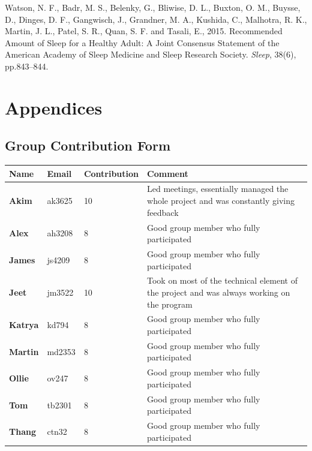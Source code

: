 \documentclass[12pt]{article}
\begin{document}
\begin{thebibliography}{99}
    Watson, N. F., Badr, M. S., Belenky, G., Bliwise, D. L., Buxton, O. M., Buysse, D., 
    Dinges, D. F., Gangwisch, J., Grandner, M. A., Kushida, C., Malhotra, R. K., Martin, J. L., Patel, S. R., 
    Quan, S. F. and Tasali, E., 2015. 
    Recommended Amount of Sleep for a Healthy Adult: 
    A Joint Consensus Statement of the American Academy of Sleep Medicine and Sleep Research Society. 
    \textit{Sleep}, 38(6), pp.843–844.
\end{thebibliography}


\newpage
\section{Appendices}
\subsection{Group Contribution Form}

\begin{table}[!ht]
\centering
\begin{tabular}{|p{1.5cm}|p{1.5cm}|p{3cm}|p{6cm}|}
\hline
\textbf{Name} & \textbf{Email} & \textbf{Contribution} & \textbf{Comment} \\
\hline
\textbf{Akim} &  ak3625 & 10 & Led meetings, essentially managed the whole project and was constantly giving feedback  \\
\hline
\textbf{Alex} & ah3208 & 8 & Good group member who fully participated \\
\hline
\textbf{James} & js4209 & 8 & Good group member who fully participated\\
\hline
\textbf{Jeet} & jm3522 & 10 & Took on most of the technical element of the project and was always working on the program\\
\hline
\textbf{Katrya} & kd794 & 8 & Good group member who fully participated\\
\hline
\textbf{Martin} & md2353 & 8 & Good group member who fully participated \\
\hline
\textbf{Ollie} & ov247 & 8 & Good group member who fully participated\\
\hline
\textbf{Tom} & tb2301 & 8 & Good group member who fully participated\\
\hline
\textbf{Thang} & ctn32 & 8 & Good group member who fully participated\\
\hline
\end{tabular}
\end{table}
\end{document}
